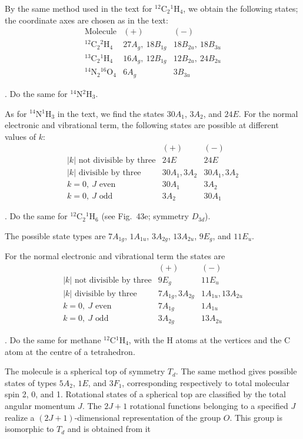 \SolutionHeading By the same method used in the text for ${}^{12}\mathrm C_2{}^1\mathrm H_4$, we obtain the following states; the coordinate axes are chosen as in the text:
\[
\begin{array}{c|c|c}
\text{Molecule}&(+)&(-)\\\hline
{}^{12}\mathrm C_2{}^2\mathrm H_4&27A_g,\ 18B_{1g}&18B_{2u},\ 18B_{3u}\\
{}^{13}\mathrm C_2{}^1\mathrm H_4&16A_g,\ 12B_{1g}&12B_{2u},\ 24B_{2u}\\
{}^{14}\mathrm N_2{}^{16}\mathrm O_4&6A_g&3B_{3u}
\end{array}
\]

. Do the same for ${}^{14}\mathrm N{}^2\mathrm H_3$.

\SolutionHeading As for ${}^{14}\mathrm N{}^1\mathrm H_3$ in the text, we find the states $30A_1$, $3A_2$, and $24E$. For the normal electronic and vibrational term, the following states are possible at different values of $k$:
\[
\begin{array}{l|cc}&(+)&(-)\\\hline
|k|\text{ not divisible by three}&24E&24E\\
|k|\text{ divisible by three}&30A_1,3A_2&30A_1,3A_2\\
k=0,\ J\text{ even}&30A_1&3A_2\\
k=0,\ J\text{ odd}&3A_2&30A_1
\end{array}
\]

. Do the same for ${}^{12}\mathrm C_2{}^1\mathrm H_6$ (see Fig.~43e; symmetry $D_{3d}$).

\SolutionHeading The possible state types are $7A_{1g}$, $1A_{1u}$, $3A_{2g}$, $13A_{2u}$, $9E_g$, and $11E_u$.

For the normal electronic and vibrational term the states are
\[
\begin{array}{l|cc}&(+)&(-)\\\hline
|k|\text{ not divisible by three}&9E_g&11E_u\\
|k|\text{ divisible by three}&7A_{1g},3A_{2g}&1A_{1u},13A_{2u}\\
k=0,\ J\text{ even}&7A_{1g}&1A_{1u}\\
k=0,\ J\text{ odd}&3A_{2g}&13A_{2u}
\end{array}
\]

. Do the same for methane ${}^{12}\mathrm C{}^1\mathrm H_4$, with the H atoms at the vertices and the C atom at the centre of a tetrahedron.

\SolutionHeading The molecule is a spherical top of symmetry $T_d$. The same method gives possible states of types $5A_2$, $1E$, and $3F_1$, corresponding respectively to total molecular spin 2, 0, and 1. Rotational states of a spherical top are classified by the total angular momentum $J$. The $2J+1$ rotational functions belonging to a specified $J$ realize a $(2J+1)$-dimensional representation of the group $O$. This group is isomorphic to $T_d$ and is obtained from it

